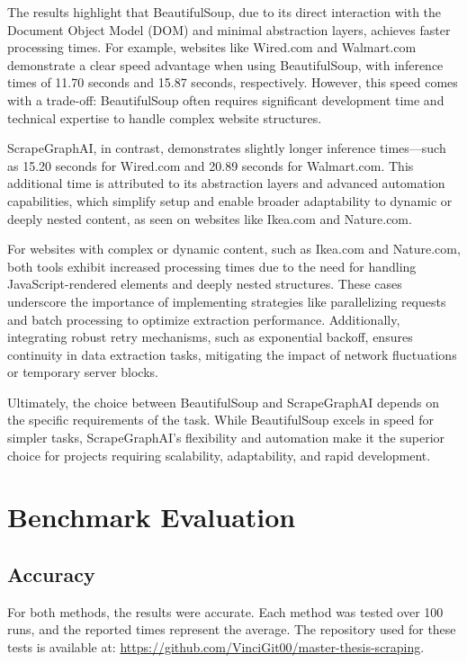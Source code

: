 The results highlight that BeautifulSoup, due to its direct interaction with the Document Object Model (DOM) and minimal abstraction layers, achieves faster processing times. For example, websites like Wired.com and Walmart.com demonstrate a clear speed advantage when using BeautifulSoup, with inference times of 11.70 seconds and 15.87 seconds, respectively. However, this speed comes with a trade-off: BeautifulSoup often requires significant development time and technical expertise to handle complex website structures.

ScrapeGraphAI, in contrast, demonstrates slightly longer inference times—such as 15.20 seconds for Wired.com and 20.89 seconds for Walmart.com. This additional time is attributed to its abstraction layers and advanced automation capabilities, which simplify setup and enable broader adaptability to dynamic or deeply nested content, as seen on websites like Ikea.com and Nature.com.

For websites with complex or dynamic content, such as Ikea.com and Nature.com, both tools exhibit increased processing times due to the need for handling JavaScript-rendered elements and deeply nested structures. These cases underscore the importance of implementing strategies like parallelizing requests and batch processing to optimize extraction performance. Additionally, integrating robust retry mechanisms, such as exponential backoff, ensures continuity in data extraction tasks, mitigating the impact of network fluctuations or temporary server blocks.

Ultimately, the choice between BeautifulSoup and ScrapeGraphAI depends on the specific requirements of the task. While BeautifulSoup excels in speed for simpler tasks, ScrapeGraphAI's flexibility and automation make it the superior choice for projects requiring scalability, adaptability, and rapid development.
\section{Benchmark Evaluation}

\subsection{Accuracy}

For both methods, the results were accurate. Each method was tested over 100 runs, and the reported times represent the average. The repository used for these tests is available at: \url{https://github.com/VinciGit00/master-thesis-scraping}.

